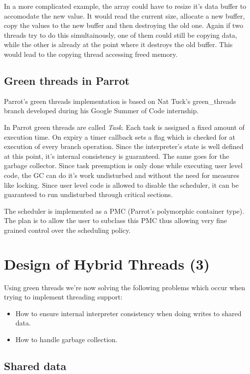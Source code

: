 \documentclass[bachelor,english]{hgbthesis}
\begin{document}
In a more complicated example, the array could have to resize it's data buffer to accomodate the new value. It would read the current size, allocate a new buffer, copy the values to the new buffer and then destroying the old one. Again if two threads try to do this simultainously, one of them could still be copying data, while the other is already at the point where it destroys the old buffer. This would lead to the copying thread accessing freed memory.

\section{Green threads in Parrot}

Parrot's green threads implementation is based on Nat Tuck's green\_threads branch developed during his Google Summer of Code internship.

In Parrot green threads are called \textit{Task}. Each task is assigned a fixed amount of execution time. On expiry a timer callback sets a flag which is checked for at execution of every branch operation. Since the interpreter's state is well defined at this point, it's internal consistency is guaranteed. The same goes for the garbage collector. Since task preemption is only done while executing user level code, the GC can do it's work undisturbed and without the need for measures like locking. Since user level code is allowed to disable the scheduler, it can be guaranteed to run undisturbed through critical sections.

The scheduler is implemented as a PMC (Parrot's polymorphic container type). The plan is to allow the user to subclass this PMC thus allowing very fine grained control over the scheduling policy.

\chapter{Design of Hybrid Threads (3)}

Using green threads we're now solving the following problems which occur when trying to implement threading support:
%
\begin{itemize}
\item How to ensure internal interpreter consistency when doing writes to shared data.
\item How to handle garbage collection.
\end{itemize}

\section{Shared data}
\end{document}
